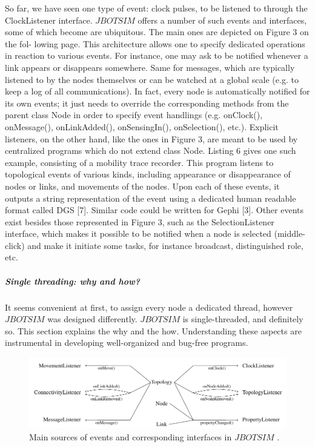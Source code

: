 So far, we have seen one type of event: clock pulses, to be listened to through the ClockListener interface. $JBOTSIM$ offers a number of such events and interfaces, some of which become are ubiquitous. The main ones are depicted on Figure 3 on the fol- lowing page. This architecture allows one to specify dedicated operations in reaction to various events. For instance, one may ask to be notified whenever a link appears or disappears somewhere. Same for messages, which are typically listened to by the nodes themselves or can be watched at a global scale (e.g. to keep a log of all communications). In fact, every node is automatically notified for its own events; it just needs to override the corresponding methods from the parent class Node in order to specify event handlings (e.g. onClock(), onMessage(), onLinkAdded(), onSensingIn(), onSelection(), etc.). Explicit listeners, on the other hand, like the ones in Figure 3, are meant to be used by centralized programs which do not extend class Node. Listing 6 gives one such example, consisting of a mobility trace recorder. This program listens to topological events of various kinds, including appearance or disappearance of nodes or links, and movements of the nodes. Upon each of these events, it outputs a string representation of the event using a dedicated human readable format called DGS [7]. Similar code could be written for Gephi [3]. Other events exist besides those represented in Figure 3, such as the SelectionListener interface, which makes it possible to be notified when a node is selected (middle-click) and make it initiate some tasks, for instance broadcast, distinguished role, etc.
\subparagraph{Single threading: why and how?}It seems convenient at first, to assign every node a dedicated thread, however $JBOTSIM$ was designed differently. $JBOTSIM$ is single-threaded, and definitely so. This section explains the why and the how. Understanding these aspects are instrumental in developing well-organized and bug-free programs.
\begin{figure}[h!]
	\centering
	\includegraphics[width=1\linewidth]{fig_4}
	\caption[Main sources of events and corresponding interfaces in  $JBOTSIM$ .]{Main sources of events and corresponding interfaces in  $JBOTSIM$ .}
	\label{fig:fig4}
\end{figure}

